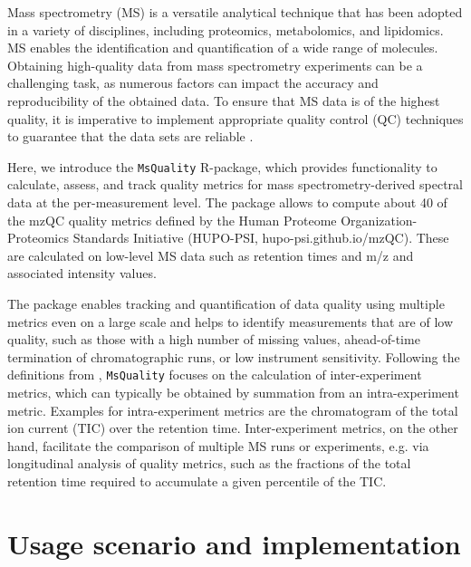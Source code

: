 \documentclass{bioinfo}
\begin{document}

\maketitle

Mass spectrometry (MS) is a versatile analytical technique that has been 
adopted in a variety of disciplines, including proteomics, metabolomics, and 
lipidomics. MS enables the identification and quantification of a wide range 
of molecules. Obtaining high-quality data from mass spectrometry experiments 
can be a challenging task, as numerous factors can impact the accuracy and 
reproducibility of the obtained data. To ensure that MS data is of the 
highest quality, it is imperative to implement appropriate quality control 
(QC) techniques to guarantee that the data sets are reliable 
\citep{Koecher2011}.

Here, we introduce the \texttt{MsQuality} R-package, which provides 
functionality to calculate, assess, and track quality metrics for mass 
spectrometry-derived spectral data at the per-measurement level. 
The package allows to compute about 40 of the mzQC quality metrics defined by
the Human Proteome Organization-Proteomics Standards Initiative (HUPO-PSI,
hupo-psi.github.io/mzQC). These are calculated on low-level MS data
such as retention times and m/z and associated intensity values.

The package enables tracking and quantification of data quality using 
multiple metrics even on a large scale and helps to identify measurements that 
are of low quality, such as those with a high number of missing values, 
ahead-of-time termination of chromatographic runs, or low instrument sensitivity. 
Following the definitions from \cite{Bittremieux2017}, \texttt{MsQuality}
focuses on the calculation of inter-experiment metrics, which can typically be 
obtained by summation from an intra-experiment metric. Examples for
intra-experiment metrics are the chromatogram of the total ion current (TIC) 
over the retention time. Inter-experiment metrics, on the other hand, 
facilitate the comparison of multiple MS runs or experiments, 
e.g. via longitudinal analysis of quality metrics, such as the
fractions of the total retention time required to accumulate a given
percentile of the TIC.

\section{Usage scenario and implementation} \label{usagescenario}
\end{document}

